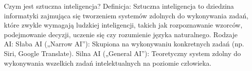 \begin{frame}{Czym jest sztuczna inteligencja?}
Definicja:
Sztuczna inteligencja to dziedzina informatyki zajmująca się tworzeniem systemów zdolnych do wykonywania zadań, które zwykle wymagają ludzkiej inteligencji, takich jak rozpoznawanie wzorców, podejmowanie decyzji, uczenie się czy rozumienie języka naturalnego.
Rodzaje AI:
Słaba AI („Narrow AI”): Skupiona na wykonywaniu konkretnych zadań (np. Siri, Google Translate).
Silna AI („General AI”): Teoretyczny system zdolny do wykonywania wszelkich zadań intelektualnych na poziomie człowieka.
\end{frame}

